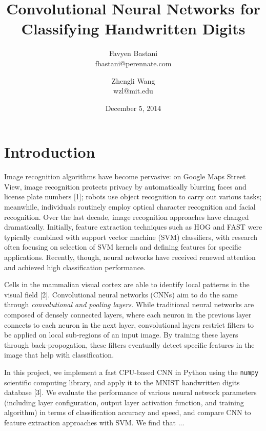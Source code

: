 \documentclass[10pt,twocolumn]{article}
\title{Convolutional Neural Networks for Classifying Handwritten Digits}
\date{December 5, 2014}
\author{
	Favyen Bastani \\
	fbastani@perennate.com
	\and
	Zhengli Wang \\
	wzl@mit.edu
}
\begin{document}
\maketitle

\section{Introduction} \label{sec:introduction}

Image recognition algorithms have become pervasive: on Google Maps Street View, image recognition protects privacy by automatically blurring faces and license plate numbers [1]; robots use object recognition to carry out various tasks; meanwhile, individuals routinely employ optical character recognition and facial recognition. Over the last decade, image recognition approaches have changed dramatically. Initially, feature extraction techniques such as HOG and FAST were typically combined with support vector machine (SVM) classifiers, with research often focusing on selection of SVM kernels and defining features for specific applications. Recently, though, neural networks have received renewed attention and achieved high classification performance.


Cells in the mammalian visual cortex are able to identify local patterns in the visual field [2]. Convolutional neural networks (CNNs) aim to do the same through \emph{convolutional and pooling layers}. While traditional neural networks are composed of densely connected layers, where each neuron in the previous layer connects to each neuron in the next layer, convolutional layers restrict filters to be applied on local sub-regions of an input image. By training these layers through back-propogation, these filters eventually detect specific features in the image that help with classification.


In this project, we implement a fast CPU-based CNN in Python using the \texttt{numpy} scientific computing library, and apply it to the MNIST handwritten digits database [3]. We evaluate the performance of various neural network parameters (including layer configuration, output layer activation function, and training algorithm) in terms of classification accuracy and speed, and compare CNN to feature extraction approaches with SVM. We find that ...

\end{document}
